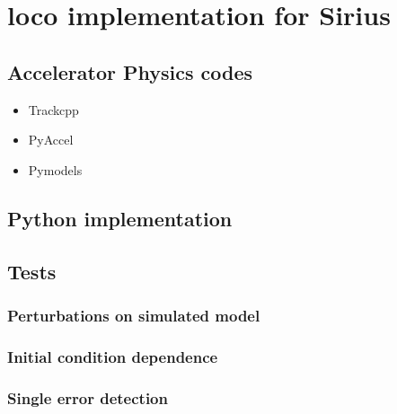 \chapter{\gls{loco} implementation for Sirius}
\section{Accelerator Physics codes}
\begin{itemize}
    \item Trackcpp
    \item PyAccel
    \item Pymodels
\end{itemize}
\section{Python implementation}
\section{Tests}
\subsection{Perturbations on simulated model}
\subsection{Initial condition dependence}
\subsection{Single error detection}






